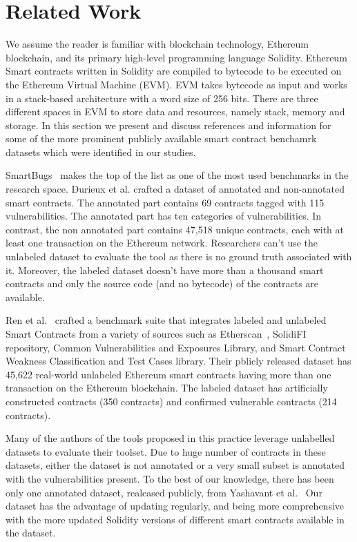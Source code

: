 \section{Related Work}
	\label{sec:relwork}
	We assume the reader is familiar with blockchain technology, Ethereum blockchain, and its primary high-level programming language Solidity.
	Ethereum Smart contracts written in Solidity are compiled to bytecode to be executed on the Ethereum Virtual Machine (EVM).
	EVM takes bytecode as input and works in a stack-based architecture with a word size of 256 bits.
	There are three different spaces in EVM to store data and resources, namely stack, memory and storage.
	In this section we present and discuss references and information for some of the more prominent publicly available smart contract benchamrk datasets which were identified in our studies.

	SmartBugs~\cite{Empirical-Review-of-Automated-Analysis-Tools-on-47587-Ethereum-Smart-Contracts} makes the top of the list as one of the most used benchmarks in the research space.
	Durieux et al. crafted a dataset of annotated and non-annotated smart contracts.
	The annotated part contains 69 contracts tagged with 115 vulnerabilities.
	The annotated part has ten categories of vulnerabilities.
	In contrast, the non annotated part contains 47,518 unique contracts, each with at least one transaction on the Ethereum network.
	Researchers can't use the unlabeled dataset to evaluate the tool as there is no ground truth associated with it.
	Moreover, the labeled dataset doesn't have more than a thousand smart contracts and only the source code (and no bytecode) of the contracts are available.

	Ren et al.~\cite{Empirical-Evaluation-of-Smart-Contract-Testing:What-is-the-Best-Choice} crafted a benchmark suite that integrates labeled and unlabeled Smart Contracts from a variety of sources such as Etherscan~\cite{etherscan}, SolidiFI repository, Common Vulnerabilities and Exposures Library, and Smart Contract Weakness Classification and Test Cases library.
	Their pblicly released dataset has 45,622 real-world unlabeled Ethereum smart contracts having more than one transaction on the Ethereum blockchain.
	The labeled dataset has artificially constructed contracts (350 contracts) and confirmed vulnerable contracts (214 contracts).

	Many of the authors of the tools proposed in this practice leverage unlabelled datasets to evaluate their toolset.
	Due to huge number of contracts in these datasets, either the dataset is not annotated or a very small subset is annotated with the vulnerabilities present.
	To the best of our knowledge, there has been only one annotated dataset, realeased publicly, from Yashavant et al.~\cite{yashavant2022scrawld}
	Our dataset has the advantage of updating regularly, and being more comprehensive with the more updated Solidity versions of different smart contracts available in the dataset.

